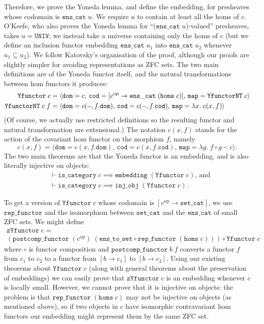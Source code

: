 \documentclass[twoside,titlepage,11pt]{article}
\begin{document}
Therefore, we prove the Yoneda lemma, and define the embedding, for presheaves whose codomain is $\mathtt{ens\_cat}\;u$.
We require $u$ to contain at least all the homs of $c$.
O'Keefe, who also proves the Yoneda lemma for ``($\mathtt{ens\_cat}\;u$)-valued'' presheaves, takes $u=\mathtt{UNIV}$; we instead take a universe containing only the homs of $c$ (but we define an inclusion functor embedding $\mathtt{ens\_cat}\;u_1$ into $\mathtt{ens\_cat}\;u_2$ whenever $u_1\subseteq u_2$).
We follow Katovsky's organisation of the proof, although our proofs are slightly simpler for avoiding representations as ZFC sets.
The two main definitions are of the Yoneda functor itself, and the natural transformations between hom functors it produces:
\begin{align*}
\mathtt{Yfunctor}\;c&=\langle\mathtt{dom}=c,\,\mathtt{cod}=[c\op\to\mathtt{ens\_cat}\;(\mathtt{homs}\;c)],\,\mathtt{map}=\mathtt{YfunctorNT}\;c\rangle\\
\mathtt{YfunctorNT}\;c\;f&=\langle\mathtt{dom}=c(\blank,f.\mathtt{dom}),\,\mathtt{cod}=c(\blank,f.\mathtt{cod}),\,\mathtt{map}=\lambda{x}.\;c(x,f)\rangle
\end{align*}
(Of course, we actually use restricted definitions so the resulting functor and natural transformation are extensional.)
The notation $c(x,f)$ stands for the action of the covariant hom functor on the morphism $f$, namely \[c(x,f)=\langle\mathtt{dom}=c(x,f.\mathtt{dom}),\,\mathtt{cod}=c(x,f.\mathtt{cod}),\,\mathtt{map}=\lambda{g}.\;f\circ g\operatorname{\mathtt{-:}}c\rangle\text{.}\]
The two main theorems are that the Yoneda functor is an embedding, and is also literally injective on objects:
\begin{align*}
&\vdash\mathtt{is\_category}\;c\implies\mathtt{embedding}\;(\mathtt{Yfunctor}\;c)\text{, and}\\
&\vdash\mathtt{is\_category}\;c\implies\mathtt{inj\_obj}\;(\mathtt{Yfunctor}\;c)\text{.}
\end{align*}

To get a version of $\mathtt{Yfunctor}\;c$ whose codomain is $[c^\mathrm{op}\to\mathtt{set\_cat}]$, we use $\mathtt{rep\_functor}$ and the isomorphism between $\mathtt{set\_cat}$ and the $\mathtt{ens\_cat}$ of small ZFC sets.
We might define
\begin{multline*}
\mathtt{zYfunctor}\;c=\\(\mathtt{postcomp\_functor}\;(c^\mathrm{op})\;(\mathtt{ens\_to\_set}\circ\mathtt{rep\_functor}\;(\mathtt{homs}\;c)))\circ\mathtt{Yfunctor}\;c
\end{multline*}
where $\circ$ is functor composition and $\mathtt{postcomp\_functor}\;b\;f$ converts a functor $f$ from $c_1$ to $c_2$ to a functor from $[b\to c_1]$ to $[b\to c_2]$.
Using our existing theorems about $\mathtt{Yfunctor}\;c$ (along with general theorems about the preservation of embeddings) we can easily prove that $\mathtt{zYfunctor}\;c$ is an embedding whenever $c$ is locally small.
However, we cannot prove that it is injective on objects: the problem is that $\mathtt{rep\_functor}\;(\mathtt{homs}\;c)$ may not be injective on objects (as mentioned above), so if two objects in $c$ have isomorphic contravariant hom functors our embedding might represent them by the same ZFC set.
\end{document}
